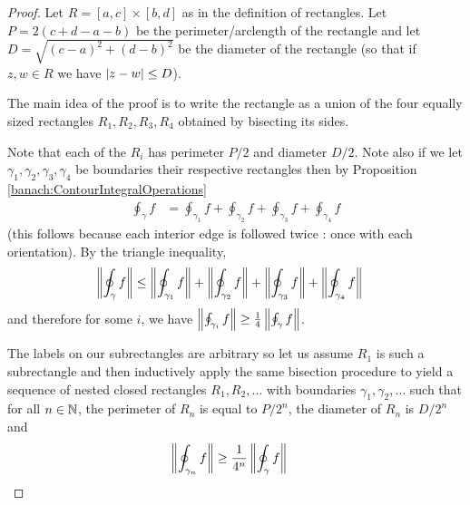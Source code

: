 \begin{proof}
Let $R = [a,c] \times [b,d]$ as in the definition of rectangles.   Let $P=2\left( c + d - a -b \right)$ be the perimeter/arclength of the rectangle and let $D = \sqrt{(c-a)^2 + (d - b)^2}$ be the diameter of the rectangle (so that if $z,w \in R$ we have $\left \vert z -w \right \vert \leq D$).

The main idea of the proof is to write the rectangle as a union of the four equally sized rectangles $R_1, R_2, R_3, R_4$ obtained by bisecting its sides.


Note that each of the $R_i$ has perimeter $P/2$ and diameter $D/2$.   Note also if we let $\gamma_1, \gamma_2, \gamma_3, \gamma_4$ be boundaries their respective rectangles then by Proposition \ref{banach:ContourIntegralOperations}
\begin{align*}
\oint_\gamma f &= \oint_{\gamma_1} f + \oint_{\gamma_2} f + \oint_{\gamma_3} f + \oint_{\gamma_4} f
\end{align*}
(this follows because each interior edge is followed twice : once with each orientation).   By the triangle inequality, 
\begin{align*}
\left \lVert \oint_\gamma f \right \rVert &\leq \left \lVert \oint_{\gamma_1} f \right \rVert + \left \lVert \oint_{\gamma_2} f \right \rVert + \left \lVert \oint_{\gamma_3} f \right \rVert + \left \lVert \oint_{\gamma_4} f \right \rVert
\end{align*}
and therefore for some $i$, we have $\left \lVert \oint_{\gamma_i} f \right \rVert \geq \frac{1}{4} \left \lVert \oint_\gamma f \right \rVert$.   

The labels on our subrectangles are arbitrary so let us assume $R_1$ is such a subrectangle and then inductively apply the same bisection procedure to yield a sequence of nested closed rectangles $R_1, R_2, \dots$ with boundaries $\gamma_1, \gamma_2, \dots$ such that for all $n \in \mathbb{N}$, the perimeter of $R_n$ is equal to $P/2^n$, the diameter of $R_n$ is $D/2^n$ and 
\begin{align*}
\left \lVert \oint_{\gamma_n} f \right \rVert &\geq \frac{1}{4^n} \left \lVert \oint_{\gamma} f \right \rVert
\end{align*}


\end{proof}
